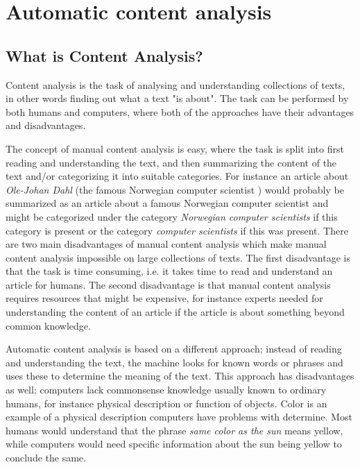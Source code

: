 \section{Automatic content analysis}

\subsection{What is Content Analysis?}
Content analysis is the task of analysing and understanding collections of texts, in other words finding out what a text "is about". The task can be performed by both humans and computers, where both of the approaches have their advantages and disadvantages.

The concept of manual content analysis is easy, where the task is split into first reading and understanding the text, and then summarizing the content of the text and/or categorizing it into suitable categories. For instance an article about \emph{Ole-Johan Dahl} (the famous Norwegian computer scientist \cite{Olejohandahleng}) would probably be summarized as an article about a famous Norwegian computer scientist and might be categorized under the category \emph{Norwegian computer scientists} if this category is present or the category \emph{computer scientists} if this was present.  
There are two main disadvantages of manual content analysis which make manual content analysis impossible on large collections of texts. The first disadvantage is that the task is time consuming, i.e. it takes time to read and understand an article for humans. The second disadvantage is that manual content analysis requires resources that might be expensive, for instance experts needed for understanding the content of an article if the article is about something beyond common knowledge.

Automatic content analysis is based on a different approach; instead of reading and understanding the text, the machine looks for known words or phrases and uses these to determine the meaning of the text. This approach has disadvantages as well; computers lack commonsense knowledge usually known to ordinary humans, for instance physical description or function of objects. Color is an example of a physical description computers have problems with determine. Most humans would understand that the phrase \emph{same color as the sun} means yellow, while computers would need specific information about the sun being yellow to conclude the same. 

